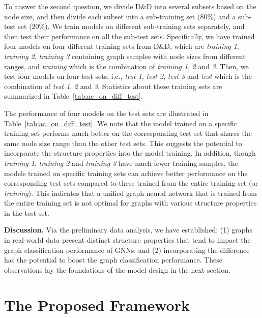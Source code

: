 \documentclass[11pt,dvipdfm]{article}
\begin{document}
To answer the second question, we divide D\&D into several subsets based on the node size, and then divide each subset into a sub-training set ($80\%$) and a sub-test set ($20\%$). We train models on different sub-training sets separately, and then test their performance on all the sub-test sets. 
Specifically, we have trained four models on four different training sets from D\&D, which are {\it training 1}, {\it training 2}, {\it training 3} containing graph samples with node sizes from different ranges, and {\it training} which is the combination of {\it training 1}, {\it 2} and {\it 3}. 
Then, we test four models on four test sets, i.e., {\it test 1}, {\it test 2}, {\it test 3} and {\it test} which is the combination of {\it test 1}, {\it 2} and {\it 3}. Statistics about these training sets are summarized in Table~\ref{tab:ac_on_diff_test}.

The performance of four models on the test sets are illustrated in Table~\ref{tab:ac_on_diff_test}. 
We note that the model trained on a specific training set performs much better on the corresponding test set that shares the same node size range than the other test sets. This suggests the potential to incorporate the structure properties into the model training. 
In addition, though {\it training 1}, {\it training 2} and {\it training 3}  have much fewer training samples, the models trained on specific training sets can achieve better performance on the corresponding test sets compared to these trained from the entire training set (or {\it training}). 
This indicates that a unified graph neural network that is trained from the entire training set is not optimal for graphs with various structure properties in the test set.


{\textbf{Discussion.}} Via the preliminary data analysis, we have established: (1) graphs in real-world data present distinct structure properties that tend to impact the graph classification performance of GNNs; and (2) incorporating the difference has the potential to boost the graph classification performance.  These observations lay the foundations of the model design in the next section.  


\section{The Proposed Framework}\label{sec:model}
\end{document}
